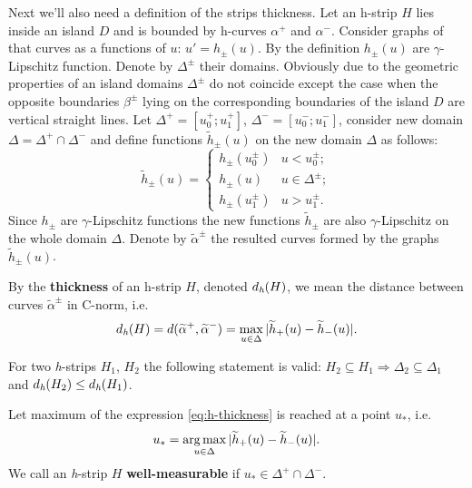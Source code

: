 Next we'll also need a definition of the strips thickness.
Let an h-strip $H$ lies inside an island $D$ and is bounded by h-curves $\alpha^+$ and $\alpha^-$.
Consider graphs of that curves as a functions of $u$: $u' = h_{\pm}(u)$.
By the definition $h_{\pm}(u)$ are $\gamma$-Lipschitz function.
Denote by $\Delta^{\pm}$ their domains.
Obviously due to the geometric properties of an island domains $\Delta^{\pm}$ do not coincide except the case when the opposite boundaries $\beta^{\pm}$ lying on the corresponding boundaries of the island $D$ are vertical straight lines.
Let $\Delta^+ = [u_0^+; u_1^+]$, $\Delta^- = [u_0^-; u_1^-]$, consider new domain $\Delta = \Delta^+ \cap \Delta^-$ and define functions $\widetilde{h}_{\pm}(u)$ on the new domain $\Delta$ as follows:
\begin{equation}
	\widetilde{h}_{\pm}(u) = \begin{cases}
		h_{\pm}(u_0^{\pm}) & u < u_0^{\pm}; \\
		h_{\pm}(u) & u \in \Delta^{\pm}; \\
		h_{\pm}(u_1^{\pm}) & u > u_1^{\pm}.
	\end{cases}
\label{eq:continuation}
\end{equation}
Since $h_{\pm}$ are $\gamma$-Lipschitz functions the new functions $\widetilde{h}_{\pm}$ are also $\gamma$-Lipschitz on the whole domain $\Delta$.
Denote by $\widetilde{\alpha}^{\pm}$ the resulted curves formed by the graphs $\widetilde{h}_{\pm}(u)$.

\begin{definition}
	By the {\bf thickness} of an h-strip $H$, denoted $d_\emph{h}(H)$, we mean the distance between curves $\widetilde{\alpha}^{\pm}$ in C-norm, i.e.
	\begin{equation}
		d_\emph{h}(H) = d(\widetilde{\alpha}^+, \widetilde{\alpha}^-) = \max \limits_{u \in \Delta} |\widetilde{h}_+(u) - \widetilde{h}_-(u)|.
	\label{eq:h-thickness}
	\end{equation}
\end{definition}

\begin{remark}
	For two \emph{h}-strips $H_1$, $H_2$ the following statement is valid: $H_2 \subseteq H_1 \Rightarrow \Delta_2 \subseteq \Delta_1$ and $d_\emph{h}(H_2) \le d_\emph{h}(H_1)$.
\end{remark}

\begin{definition}
	Let maximum of the expression \eqref{eq:h-thickness} is reached at a point $u_*$, i.e.
	\begin{equation}
		u_* = \operatorname*{arg\,max} \limits_{u \in \Delta} |\widetilde{h}_+(u) - \widetilde{h}_-(u)|.
	\label{eq:argmax}
	\end{equation}
	We call an \emph{h}-strip $H$ {\bf well-measurable} if $u_* \in \Delta^+ \cap \Delta^-$.
\label{def:well-measurable}
\end{definition}

